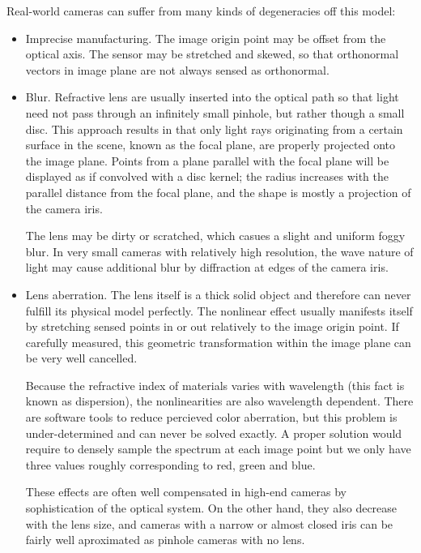 Real-world cameras can suffer from many kinds of degeneracies off this model:
\begin{itemize}

\item
Imprecise manufacturing.
The image origin point may be offset from the optical axis.
The sensor may be stretched and skewed, so that orthonormal vectors in image plane are not always sensed as orthonormal.

\item
Blur.
Refractive lens are usually inserted into the optical path so that light need not pass through an infinitely small pinhole, but rather though a small disc.
This approach results in that only light rays originating from a certain surface in the scene, known as the focal plane, are properly projected onto the image plane.
Points from a plane parallel with the focal plane will be displayed as if convolved with a disc kernel; the radius increases with the parallel distance from the focal plane, and the shape is mostly a projection of the camera iris.

The lens may be dirty or scratched, which casues a slight and uniform foggy blur.
In very small cameras with relatively high resolution, the wave nature of light may cause additional blur by diffraction at edges of the camera iris.

\item
Lens aberration.
The lens itself is a thick solid object and therefore can never fulfill its physical model perfectly.
The nonlinear effect usually manifests itself by stretching sensed points in or out relatively to the image origin point.
If carefully measured, this geometric transformation within the image plane can be very well cancelled.

Because the refractive index of materials varies with wavelength (this fact is known as dispersion), the nonlinearities are also wavelength dependent.
There are software tools to reduce percieved color aberration, but this problem is under-determined and can never be solved exactly.
A proper solution would require to densely sample the spectrum at each image point but we only have three values roughly corresponding to red, green and blue.

These effects are often well compensated in high-end cameras by sophistication of the optical system.
On the other hand, they also decrease with the lens size, and cameras with a narrow or almost closed iris can be fairly well aproximated as pinhole cameras with no lens.


\end{itemize}
